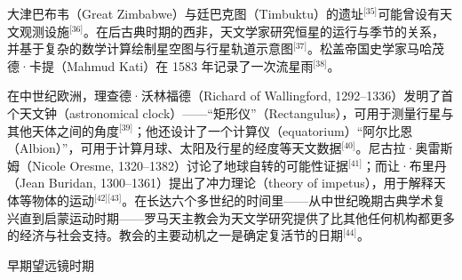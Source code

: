 大津巴布韦（Great Zimbabwe）与廷巴克图（Timbuktu）的遗址\(^\text{[35]}\)可能曾设有天文观测设施\(^\text{[36]}\)。在后古典时期的西非，天文学家研究恒星的运行与季节的关系，并基于复杂的数学计算绘制星空图与行星轨道示意图\(^\text{[37]}\)。松盖帝国史学家马哈茂德·卡提（Mahmud Kati）在 1583 年记录了一次流星雨\(^\text{[38]}\)。  

在中世纪欧洲，理查德·沃林福德（Richard of Wallingford, 1292–1336）发明了首个天文钟（astronomical clock）——“矩形仪”（Rectangulus），可用于测量行星与其他天体之间的角度\(^\text{[39]}\)；他还设计了一个计算仪（equatorium）“阿尔比恩（Albion）”，可用于计算月球、太阳及行星的经度等天文数据\(^\text{[40]}\)。尼古拉·奥雷斯姆（Nicole Oresme, 1320–1382）讨论了地球自转的可能性证据\(^\text{[41]}\)；而让·布里丹（Jean Buridan, 1300–1361）提出了冲力理论（theory of impetus），用于解释天体等物体的运动\(^\text{[42][43]}\)。在长达六个多世纪的时间里——从中世纪晚期古典学术复兴直到启蒙运动时期——罗马天主教会为天文学研究提供了比其他任何机构都更多的经济与社会支持。教会的主要动机之一是确定复活节的日期\(^\text{[44]}\)。

早期望远镜时期


